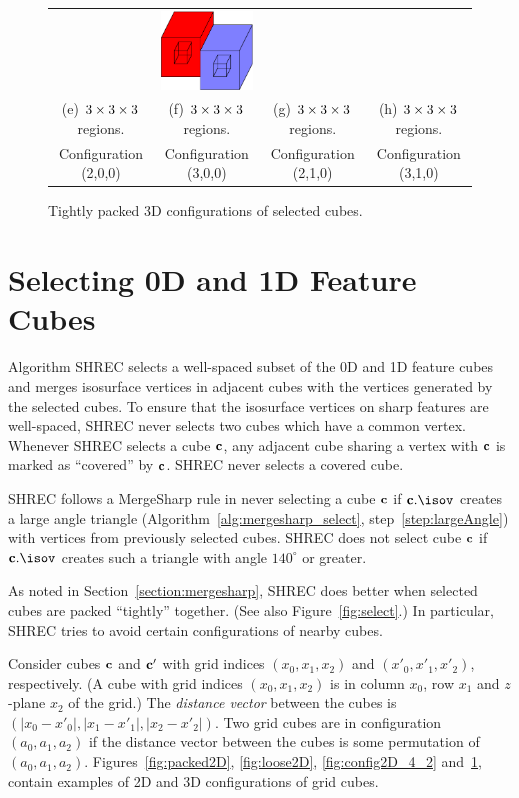 \begin{figure}
\begin{tabular}{cccc}
\qquad &
\qquad
\includegraphics[width=1.2in]{images/config3D_3_1_0_3x3x3.eps} \\
(e) $3 \times 3 \times 3$ regions. & (f) $3 \times 3 \times 3$ regions. 
  & (g) $3 \times 3 \times 3$ regions. & (h) $3 \times 3 \times 3$ regions.\\
Configuration (2,0,0) & Configuration (3,0,0) 
  & Configuration (2,1,0) & Configuration (3,1,0)
\end{tabular}
\caption{Tightly packed 3D configurations of selected cubes.}
\label{fig:packed3D}
\end{figure}


\section{Selecting 0D and 1D Feature Cubes}
\label{section:selection}

Algorithm SHREC selects a well-spaced subset 
of the 0D and 1D feature cubes
and merges isosurface vertices in adjacent cubes 
with the vertices generated by the selected cubes.
To ensure that the isosurface vertices on sharp features are well-spaced,
SHREC never selects two cubes which have a common vertex.
Whenever SHREC selects a cube $\mathbf{c}$,
any adjacent cube sharing a vertex with $\mathbf{c}$ is marked as ``covered''
by $\mathbf{c}$.
SHREC never selects a covered cube.

SHREC follows a MergeSharp rule in never selecting a cube $\mathbf{c}$
if $\cb.\isov$ creates a large angle triangle 
(Algorithm~\ref{alg:mergesharp_select}, step~\ref{step:largeAngle})
with vertices from previously selected cubes.
SHREC does not select cube $\mathbf{c}$
if $\cb.\isov$ creates such a triangle with angle $140^\circ$ or greater.

As noted in Section~\ref{section:mergesharp}, 
SHREC does better when selected cubes 
are packed ``tightly'' together.
(See also Figure~\ref{fig:select}.)
In particular, SHREC tries to avoid certain configurations of nearby cubes.

Consider cubes $\mathbf{c}$ and $\mathbf{c}'$ with grid indices $(x_0,x_1,x_2)$
and $(x'_0,x'_1,x'_2)$, respectively.
(A cube with grid indices $(x_0,x_1,x_2)$ is in column $x_0$, row $x_1$
and $z$-plane $x_2$ of the grid.)
The {\em distance vector} between the cubes is
$(|x_0-x'_0|, |x_1-x'_1|, |x_2-x'_2|)$.
Two grid cubes are in configuration $(a_0,a_1,a_2)$ if the distance vector
between the cubes is some permutation of $(a_0,a_1,a_2)$.
Figures~\ref{fig:packed2D}, \ref{fig:loose2D}, \ref{fig:config2D_4_2}
and~\ref{fig:packed3D},
contain examples of 2D and 3D configurations of grid cubes.

